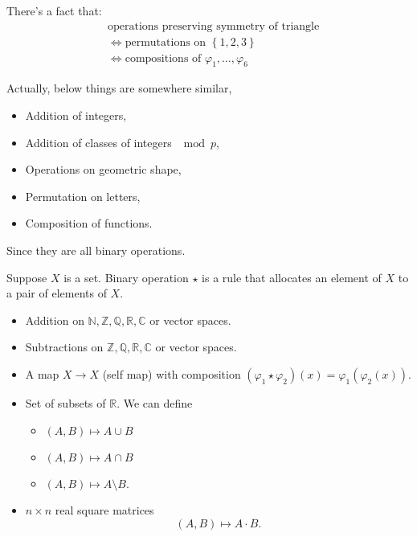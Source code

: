 \begin{note}
    There's a fact that:
    \begin{align*}
        &\text{operations preserving symmetry of triangle} \\
        &\iff \text{permutations on } \left\{ 1, 2, 3 \right\}    \\
        &\iff \text{compositions of } \varphi _1, \dots , \varphi _6
    \end{align*}
\end{note}
Actually, below things are somewhere similar,
\begin{itemize}
    \item Addition of integers, 
    \item Addition of classes of integers \(\mod{p}\),
    \item Operations on geometric shape,
    \item Permutation on letters,
    \item Composition of functions. 
\end{itemize}
 Since they are all binary operations. 
 \begin{definition} \label{def: binary operation}
    Suppose \(X\) is a set. Binary operation \(\star\) is a rule that allocates an element of \(X\) to a pair of elements of \(X\).   
 \end{definition}

 \begin{eg}
    \vphantom{text}
    \begin{itemize}
        \item Addition on \(\mathbb{N} , \mathbb{Z} , \mathbb{Q} , \mathbb{R} , \mathbb{C} \) or vector spaces.
        \item Subtractions on \(\mathbb{Z} , \mathbb{Q} , \mathbb{R} , \mathbb{C}\) or vector spaces.  
        \item A map \(X \to X\) (self map) with composition \(\left( \varphi _1 \star \varphi _2 \right) (x)  = \varphi_1 \left( \varphi _2 (x) \right) \). 
        \item Set of subsets of \(\mathbb{R} \). We can define 
        \begin{itemize}
            \item \((A, B) \mapsto A \cup B\) 
            \item \((A, B) \mapsto A \cap B\)
            \item \((A, B) \mapsto A \setminus B\).    
        \end{itemize}
        \item \(n \times n\) real square matrices
        \[
            (A, B) \mapsto A \cdot B.
        \]
    \end{itemize}
 \end{eg}

